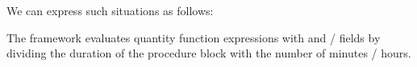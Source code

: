 We can express such situations as follows:

The framework evaluates quantity function expressions with  and / fields by dividing the duration of the procedure block with the number of minutes / hours.

